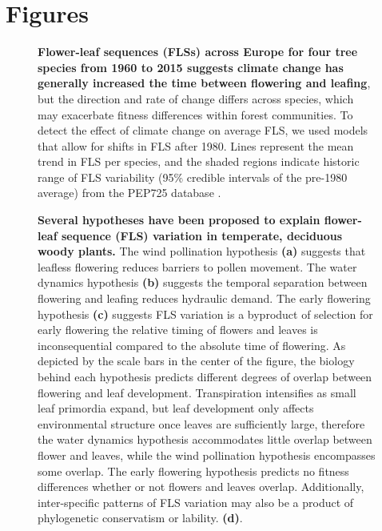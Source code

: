 \documentclass[11pt]{article}
\begin{document}
{\section*{Figures}


\begin{figure}[h!]
    \centering
    \caption{\textbf{Flower-leaf sequences (FLSs) across Europe for four tree species from 1960 to 2015 suggests climate change has generally increased the time between flowering and leafing}, but the direction and rate of change differs across species, which may exacerbate fitness differences within forest communities. To detect the effect of climate change on average FLS, we used models that allow for shifts in FLS after 1980. Lines represent the mean trend in FLS per species, and the shaded regions indicate historic range of FLS variability (95\% credible intervals of the pre-1980 average) from the PEP725 database \citep{PEP725}.}
    \label{fig:climchange}
\end{figure}

\begin{figure}[h!]
    \centering
    \caption{\textbf{Several hypotheses have been proposed to explain flower-leaf sequence (FLS) variation in temperate, deciduous woody plants.}  The wind pollination hypothesis \textbf{(a)} suggests that leafless flowering reduces barriers to pollen movement. The water dynamics hypothesis \textbf{(b)} suggests the temporal separation between flowering and leafing reduces hydraulic demand. The early flowering hypothesis \textbf{(c)} suggests FLS variation is a byproduct of selection for early flowering the relative timing of flowers and leaves is inconsequential compared to the absolute time of flowering. As depicted by the scale bars in the center of the figure, the biology behind each hypothesis predicts different degrees of overlap between flowering and leaf development. Transpiration intensifies as small leaf primordia expand, but leaf development only affects environmental structure once leaves are sufficiently large, therefore the water dynamics hypothesis accommodates little overlap between flower and leaves, while the wind pollination hypothesis encompasses some overlap. The early flowering hypothesis predicts no fitness differences whether or not flowers and leaves overlap. Additionally, inter-specific patterns of FLS variation may also be a product of phylogenetic conservatism or lability. \textbf{(d)}.}
    \label{fig:conceptual}
\end{figure}
 
}
\end{document}
